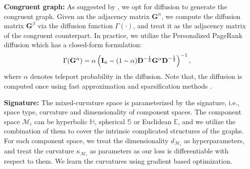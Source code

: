 \noindent\textbf{Congruent graph:} 
As suggested by \cite{HassaniA20}, we opt for diffusion to generate the congruent graph.
Given an the adjacency matrix $\mathbf G^\alpha$, we compute the diffusion matrix $\mathbf G^\beta$ via the diffusion function \emph{$\Gamma(\cdot)$}, and treat it as the adjacency matrix of the congruent counterpart. 
In practice, we utilize the Personalized PageRank diffusion which has a closed-form formulation: 
   \vspace{-0.05in}
\begin{equation}
\Gamma(\mathbf G^\alpha)=\alpha\left(\mathbf{I}_{n}-(1-\alpha) \mathbf{D}^{-\frac{1}{2}} \mathbf{G^\alpha D}^{-\frac{1}{2}}\right)^{-1},
   \vspace{-0.05in}
\end{equation}
where $\alpha$ denotes teleport probability in the diffusion. 
Note that, 
the diffusion is computed once using fast approximation and sparsification methods \cite{KlicperaWG19}.

\noindent\textbf{Signature:} The mixed-curvature space is parameterized by the signature, i.e., space type, curvature and dimensionality of component spaces.
The component space $\mathcal M_i$ can be hyperbolic $\mathbb H$, spherical $\mathbb S$ or Euclidean $\mathbb E$, and we utilize the combination of them to cover the intrinsic complicated structures of the graphs.
For each component space, we treat the dimensionality $d_{\mathcal M_i}$ as hyperparameters, 
and treat the curvature $\kappa_{\mathcal M_i}$ as parameters as our loss is differentiable with respect to them. We learn the curvatures using gradient based optimization.


